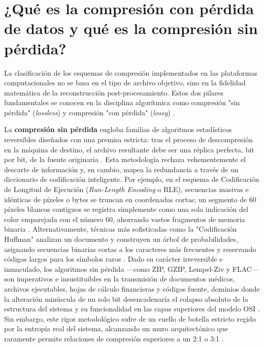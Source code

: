 \documentclass[a4paper,12pt]{article}
\begin{document}
\section{¿Qué es la compresión con pérdida de datos y qué es la compresión sin pérdida?}

La clasificación de los esquemas de compresión implementados en las plataformas computacionales no se basa en el tipo de archivo objetivo, sino en la fidelidad matemática de la reconstrucción post-procesamiento. Estos dos pilares fundamentales se conocen en la disciplina algorítmica como compresión "sin pérdida" (\textit{lossless}) y compresión "con pérdida" (\textit{lossy}) \cite{lenovo_comp, bjc_comp}.

La \textbf{compresión sin pérdida} engloba familias de algoritmos estadísticos reversibles diseñados con una premisa estricta: tras el proceso de descompresión en la máquina de destino, el archivo resultante debe ser una réplica perfecta, bit por bit, de la fuente originaria \cite{bjc_comp}. Esta metodología rechaza vehementemente el descarte de información y, en cambio, mapea la redundancia a través de un diccionario de codificación inteligente. Por ejemplo, en el esquema de Codificación de Longitud de Ejecución (\textit{Run-Length Encoding} o RLE), secuencias masivas e idénticas de píxeles o bytes se truncan en coordenadas cortas; un segmento de 60 píxeles blancos contiguos se registra simplemente como una sola indicación del color emparejada con el número 60, ahorrando vastos fragmentos de memoria binaria \cite{bjc_comp}. Alternativamente, técnicas más sofisticadas como la "Codificación Huffman" analizan un documento y construyen un árbol de probabilidades, asignando secuencias binarias cortas a los caracteres más frecuentes y reservando códigos largos para los símbolos raros \cite{lenovo_comp}. Dado su carácter irreversible e inmaculado, los algoritmos sin pérdida —como ZIP, GZIP, Lempel-Ziv y FLAC— son imperativos e insustituibles en la transmisión de documentos médicos, archivos ejecutables, hojas de cálculo financieras y códigos fuente, dominios donde la alteración minúscula de un solo bit desencadenaría el colapso absoluto de la estructura del sistema y su funcionalidad en las capas superiores del modelo OSI \cite{lenovo_comp, actian_comp}. Sin embargo, este rigor metodológico sufre de un cuello de botella estricto regido por la entropía real del sistema, alcanzando un muro arquitectónico que raramente permite relaciones de compresión superiores a un 2:1 o 3:1 \cite{esri_lossless}.
\end{document}
